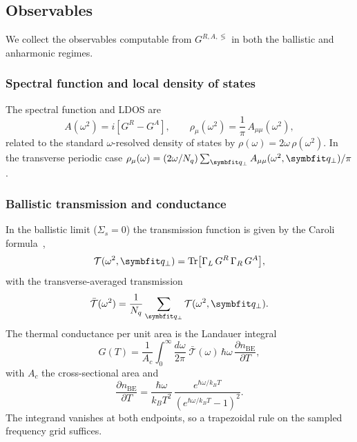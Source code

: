 \subsection{Observables}
\label{sub:negf_obs}

We collect the observables computable from $G^{R,A,\lessgtr}$ in both
the ballistic and anharmonic regimes.

\subsubsection{Spectral function and local density of states}

The spectral function and LDOS are
\begin{equation}\label{eq:dos}
  A(\omega^2) = i[G^R - G^A],
  \qquad
  \rho_\mu(\omega^2) = \frac{1}{\pi}\,A_{\mu\mu}(\omega^2),
\end{equation}
related to the standard $\omega$-resolved density of states by
$\rho(\omega) = 2\omega\,\rho(\omega^2)$. In the transverse periodic
case $\rho_\mu(\omega) = (2\omega/N_q)\sum_{\qp} A_{\mu\mu}(\omega^2,\qp)/\pi$.

\subsubsection{Ballistic transmission and conductance}

In the ballistic limit ($\Sigma_s = 0$) the transmission function is
given by the Caroli formula~\cite{caroli_direct_1971,mingo_calculation_2003,wang_nonequilibrium_2007},
\begin{equation}\label{eq:caroli}
  \mathcal{T}(\omega^2,\qp)
  = \mathrm{Tr}\bigl[\Gamma_L\,G^R\,\Gamma_R\,G^A\bigr],
\end{equation}
with the transverse-averaged transmission
\begin{equation}
  \bar{\mathcal{T}}(\omega^2)
  = \frac{1}{N_q}\sum_{\qp} \mathcal{T}(\omega^2,\qp).
\end{equation}
The thermal conductance per unit area is the Landauer integral
\begin{equation}\label{eq:G_thermal}
  G(T)
  = \frac{1}{A_c}\int_0^\infty\!\frac{d\omega}{2\pi}\;
    \bar{\mathcal{T}}(\omega)\,\hbar\omega\,
    \frac{\partial n_\mathrm{BE}}{\partial T},
\end{equation}
with $A_c$ the cross-sectional area and
\begin{equation}
  \frac{\partial n_\mathrm{BE}}{\partial T}
  = \frac{\hbar\omega}{k_B T^2}\,
    \frac{e^{\hbar\omega/k_B T}}
         {(e^{\hbar\omega/k_B T}-1)^2}.
\end{equation}
The integrand vanishes at both endpoints, so a trapezoidal rule on the
sampled frequency grid suffices.

